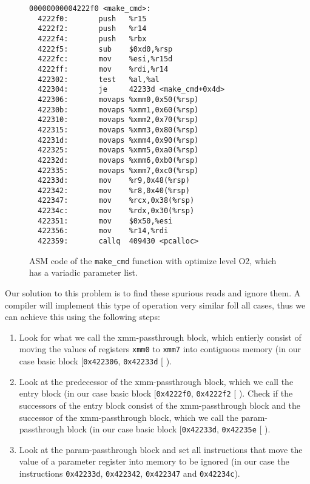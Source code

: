 \begin{figure}
\begin{BVerbatim}
00000000004222f0 <make_cmd>:
  4222f0:       push   %
  4222f2:       push   %
  4222f4:       push   %
  4222f5:       sub    $0xd0,%
  4222fc:       mov    %
  4222ff:       mov    %
  422302:       test   %
  422304:       je     42233d <make_cmd+0x4d>
  422306:       movaps %
  42230b:       movaps %
  422310:       movaps %
  422315:       movaps %
  42231d:       movaps %
  422325:       movaps %
  42232d:       movaps %
  422335:       movaps %
  42233d:       mov    %
  422342:       mov    %
  422347:       mov    %
  42234c:       mov    %
  422351:       mov    $0x50,%
  422356:       mov    %
  422359:       callq  409430 <pcalloc>
\end{BVerbatim}
\caption{ASM code of the \texttt{make\_cmd} function with optimize level O2, which has a variadic parameter list.}
\label{fig:asmvariadic}
\end{figure}

Our solution to this problem is to find these spurious reads and ignore them. A compiler will implement this type of operation very similar foll all cases, thus we can achieve this using the following steps:
\begin{enumerate}
\item Look for what we call the xmm-passthrough block, which entierly consist of moving the values of registers \texttt{xmm0} to \texttt{xmm7} into contiguous memory (in our case basic block [\texttt{0x422306}, \texttt{0x42233d} [ ).
\item Look at the predecessor of the xmm-passthrough block, which we call the entry block (in our case basic block [\texttt{0x4222f0}, \texttt{0x4222f2} [ ). Check if the successors of the entry block consist of the xmm-passthrough block and the successor of the xmm-passthrough block, which we call the param-passthrough block (in our case basic block [\texttt{0x42233d}, \texttt{0x42235e} [ ).
\item Look at the param-passthrough block and set all instructions that move the value of a parameter register into memory to be ignored (in our case the instructions \texttt{0x42233d}, \texttt{0x422342}, \texttt{0x422347} and \texttt{0x42234c}).
\end{enumerate}


